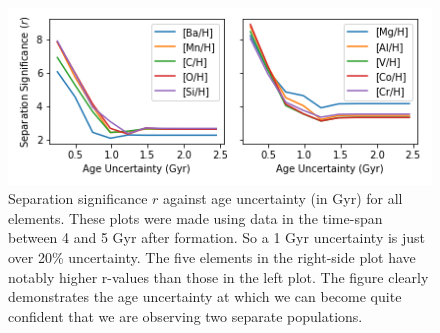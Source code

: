 \documentclass[fleqn,usenatbib]{mnras}
\newcommand{\SB}[1]{{\textcolor{orange}{SB: #1}}}
\begin{document}

\begin{figure}
	\includegraphics[width=\columnwidth]{figures/same_axis_r_age.png}
    \caption{Separation significance $r$ against age uncertainty (in Gyr) for all elements. These plots were made using data in the time-span between 4 and 5 Gyr after formation. So a 1 Gyr uncertainty is just over 20\% uncertainty. The five elements in the right-side plot have notably higher r-values than those in the left plot. The figure clearly demonstrates the age uncertainty at which we can become quite confident that we are observing two separate populations.}
    \label{fig:r_v_age}
\end{figure}



\end{document}
